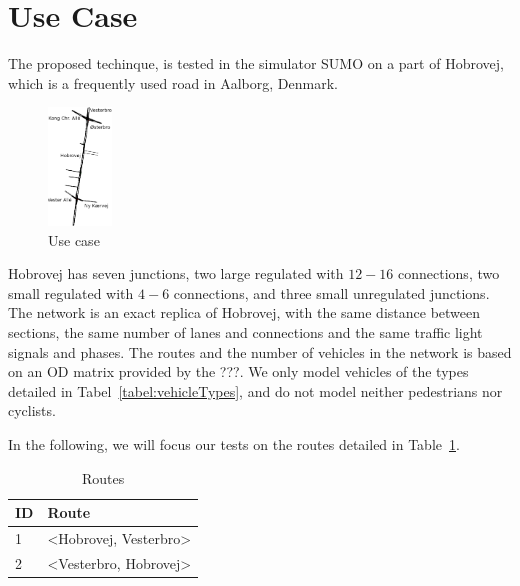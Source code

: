 \section{Use Case}
The proposed techinque, \tech is tested in the simulator SUMO on a part of Hobrovej, which is a frequently used road in Aalborg, Denmark.

\begin{figure}[htb]
\centering
\includegraphics[width=0.15\textwidth]{images/Hobrovej.png}
\caption{Use case}
\label{fig:Introduction:hobro}
\end{figure}

Hobrovej has seven junctions, two large regulated with $12-16$ connections, two small regulated with $4-6$ connections, and three small unregulated junctions.
The network is an exact replica of Hobrovej, with the same distance between sections, the same number of lanes and connections and the same traffic light signals and phases.
The routes and the number of vehicles in the network is based on an OD matrix provided by the ???.
We only model vehicles of the types detailed in Tabel~\ref{tabel:vehicleTypes}, and do not model neither pedestrians nor cyclists.

In the following, we will focus our tests on the routes detailed in Table~\ref{tb:useCase:routes}.
\begin{table} %
\centering
\begin{tabular}{|l|l|}\hline
\textbf{ID} & \textbf{Route}\\\hline
1 & <Hobrovej, Vesterbro>\\\hline
2 & <Vesterbro, Hobrovej>\\\hline
\end{tabular}
\caption{Routes}\label{tb:useCase:routes}
\end{table}